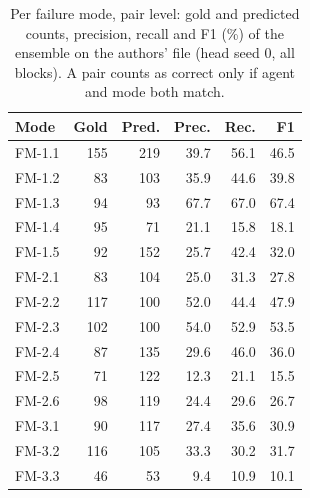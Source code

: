 \begin{table}[t]
\caption{Per failure mode, pair level: gold and predicted counts, precision, recall and F1 (\%) of the ensemble on the authors' file (head seed 0, all blocks). A pair counts as correct only if agent and mode both match.}
\label{tab:permode}
\centering\footnotesize\setlength{\tabcolsep}{3pt}
\begin{tabular}{@{}lrrrrr@{}}
\toprule
Mode & Gold & Pred. & Prec. & Rec. & F1 \\
\midrule
FM-1.1 & 155 & 219 & 39.7 & 56.1 & 46.5 \\
FM-1.2 & 83 & 103 & 35.9 & 44.6 & 39.8 \\
FM-1.3 & 94 & 93 & 67.7 & 67.0 & 67.4 \\
FM-1.4 & 95 & 71 & 21.1 & 15.8 & 18.1 \\
FM-1.5 & 92 & 152 & 25.7 & 42.4 & 32.0 \\
FM-2.1 & 83 & 104 & 25.0 & 31.3 & 27.8 \\
FM-2.2 & 117 & 100 & 52.0 & 44.4 & 47.9 \\
FM-2.3 & 102 & 100 & 54.0 & 52.9 & 53.5 \\
FM-2.4 & 87 & 135 & 29.6 & 46.0 & 36.0 \\
FM-2.5 & 71 & 122 & 12.3 & 21.1 & 15.5 \\
FM-2.6 & 98 & 119 & 24.4 & 29.6 & 26.7 \\
FM-3.1 & 90 & 117 & 27.4 & 35.6 & 30.9 \\
FM-3.2 & 116 & 105 & 33.3 & 30.2 & 31.7 \\
FM-3.3 & 46 & 53 & 9.4 & 10.9 & 10.1 \\
\bottomrule
\end{tabular}
\end{table}
